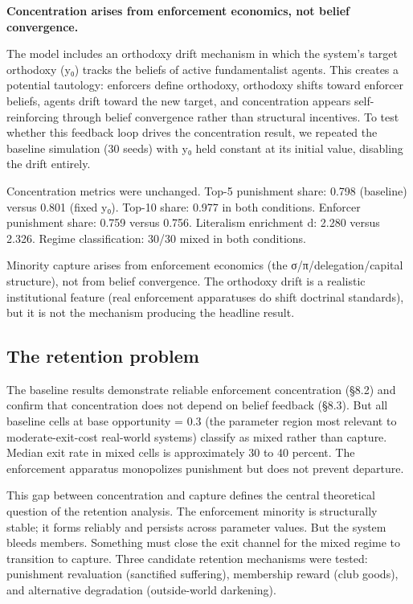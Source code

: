 \documentclass[12pt]{article}
\begin{document}
%

\textbf{Concentration arises from enforcement economics, not belief convergence.}

The model includes an orthodoxy drift mechanism in which the system's target orthodoxy (y₀) tracks the beliefs of active fundamentalist agents. This creates a potential tautology: enforcers define orthodoxy, orthodoxy shifts toward enforcer beliefs, agents drift toward the new target, and concentration appears self-reinforcing through belief convergence rather than structural incentives. To test whether this feedback loop drives the concentration result, we repeated the baseline simulation (30 seeds) with y₀ held constant at its initial value, disabling the drift entirely.

Concentration metrics were unchanged. Top-5 punishment share: 0.798 (baseline) versus 0.801 (fixed y₀). Top-10 share: 0.977 in both conditions. Enforcer punishment share: 0.759 versus 0.756. Literalism enrichment d: 2.280 versus 2.326. Regime classification: 30/30 mixed in both conditions.

Minority capture arises from enforcement economics (the σ/π/delegation/capital structure), not from belief convergence. The orthodoxy drift is a realistic institutional feature (real enforcement apparatuses do shift doctrinal standards), but it is not the mechanism producing the headline result.

%
\subsection{The retention problem}

The baseline results demonstrate reliable enforcement concentration (§8.2) and confirm that concentration does not depend on belief feedback (§8.3). But all baseline cells at base opportunity = 0.3 (the parameter region most relevant to moderate-exit-cost real-world systems) classify as mixed rather than capture. Median exit rate in mixed cells is approximately 30 to 40 percent. The enforcement apparatus monopolizes punishment but does not prevent departure.

This gap between concentration and capture defines the central theoretical question of the retention analysis. The enforcement minority is structurally stable; it forms reliably and persists across parameter values. But the system bleeds members. Something must close the exit channel for the mixed regime to transition to capture. Three candidate retention mechanisms were tested: punishment revaluation (sanctified suffering), membership reward (club goods), and alternative degradation (outside-world darkening).
\end{document}
